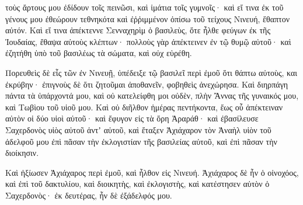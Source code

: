 {τοὺς ἄρτους μου ἐδίδουν τοῖς πεινῶσι, καὶ ἱμάτια τοῖς γυμνοῖς· καὶ εἴ τινα ἐκ τοῦ γένους μου ἐθεώρουν τεθνηκότα καὶ ἐῤῥιμμένον ὀπίσω τοῦ τείχους Νινευή, ἔθαπτον αὐτόν.
Καὶ εἴ τινα ἀπέκτεννε Σενναχηρὶμ ὁ βασιλεὺς, ὅτε ἦλθε φεύγων ἐκ τῆς Ἰουδαίας, ἔθαψα αὐτοὺς κλέπτων· πολλοὺς γὰρ ἀπέκτεινεν ἐν τῷ θυμῷ αὐτοῦ· καὶ ἐζητήθη ὑπὸ τοῦ βασιλέως τὰ σώματα, καὶ οὐχ εὑρέθη.
\par }{\PP {}Πορευθεὶς δὲ εἷς τῶν ἐν Νινευῇ, ὑπέδειξε τῷ βασιλεῖ περὶ ἐμοῦ ὅτι θάπτω αὐτοὺς, και ἐκρύβην· ἐπιγνοὺς δὲ ὅτι ζητοῦμαι ἀποθανεῖν, φοβηθεὶς ἀνεχώρησα.
Καὶ διηρπάγη πάντα τὰ ὑπάρχοντά μου, καὶ οὐ κατελείφθη μοι οὐδὲν, πλὴν Ἄννας τῆς γυναικός μου, καὶ Τωβὶου τοῦ υἱοῦ μου.
Καὶ οὐ διῆλθον ἡμέρας πεντήκοντα, ἕως οὗ ἀπέκτειναν αὐτὸν οἱ δύο υἱοὶ αὐτοῦ· καὶ ἔφυγον εἰς τὰ ὄρη Ἀραράθ· καὶ ἐβασίλευσε Σαχερδονὸς υἱὸς αὐτοῦ ἀντʼ αὐτοῦ, καὶ ἔταξεν Ἀχιάχαρον τὸν Ἀναὴλ υἱὸν τοῦ ἀδελφοῦ μου ἐπὶ πᾶσαν τὴν ἐκλογιστίαν τῆς βασιλείας αὐτοῦ, καὶ ἐπὶ πᾶσαν τὴν διοίκησιν.
\par }{\PP {}Καὶ ἠξίωσεν Ἀχιάχαρος περὶ ἐμοῦ, καὶ ἦλθον εἰς Νινευή. Ἀχιάχαρος δὲ ἦν ὁ οἰνοχόος, καὶ ἐπὶ τοῦ δακτυλίου, καὶ διοικητὴς, καὶ ἐκλογιστὴς, καὶ κατέστησεν αὐτὸν ὁ Σαχερδονὸς· ἐκ δευτέρας, ἦν δὲ ἐξάδελφός μου.

}
